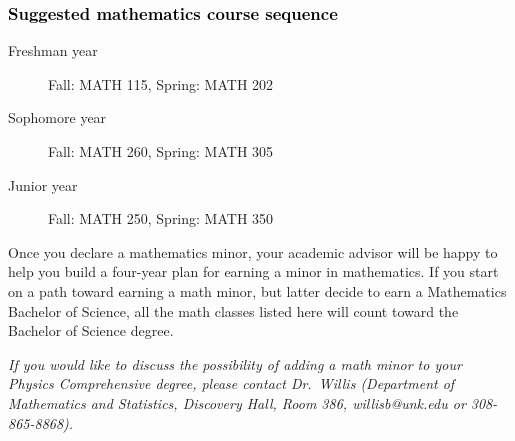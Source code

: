 \documentclass[10pt]{article}
\begin{document}
\subsubsection*{\textcolor{black}{Suggested mathematics course sequence}}

\begin{description}
   \item[\phantom{xxx} Freshman year] Fall: MATH 115, Spring:  MATH 202
      \item[\phantom{xxx} Sophomore year]  Fall: MATH 260,  Spring: MATH 305
     \item[\phantom{xxx} Junior year]  Fall: MATH 250,  Spring: MATH 350
 \end{description}
  \vspace{0.1in}

 \noindent Once you declare a mathematics minor, your academic advisor will be happy to help you build a four-year plan for earning a minor in mathematics.  If you start on a path toward earning a math minor, but latter decide to earn a  Mathematics Bachelor of Science, all the math classes listed here will count toward the Bachelor of Science degree.

   \vspace{0.1in}

\noindent \textcolor{unkblue}{\emph{If you would like to discuss the possibility of  adding a math minor to your Physics Comprehensive degree, please contact \mbox{Dr.\ Willis} (Department of Mathematics and Statistics,  Discovery Hall, Room 386, willisb@unk.edu or 308-865-8868).}}
\end{document}
